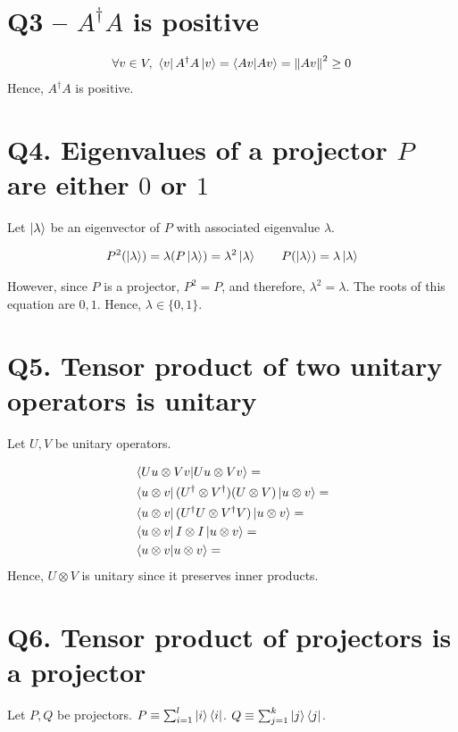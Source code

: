 \documentclass[11pt]{book}
\begin{document}
\begin{align*}
\end{align*}

\section{Q3 -- $A^\dagger A$ is positive}
\begin{align*}
    \forall v \in V, ~\bra v A^\dagger A \ket v = \bra {A v} \ket {A v} = \norm{A v}^2 \geq 0
\end{align*}
Hence, $A^\dagger A$ is positive.

\section{Q4. Eigenvalues of a projector $P$ are either $0$ or $1$}
Let $\ket \lambda$ be an eigenvector of $P$ with associated eigenvalue
$\lambda$.  

\begin{align*}
    P^2 (\ket \lambda) = \lambda (P \ket \lambda) = \lambda ^2 \ket \lambda \qquad
    P (\ket \lambda) = \lambda \ket \lambda
\end{align*}

However, since $P$ is a projector, $P^2 = P$, and therefore, $\lambda^2 = \lambda$.
The roots of this equation are $0, 1$. Hence, $\lambda \in \{0, 1\}$.

\section{Q5. Tensor product of two unitary operators is unitary}
Let $U, V$ be unitary operators.

\begin{align*}
    &\bra{U u \otimes V v} \ket{U u \otimes V v} = \\
    &\bra{u \otimes v} (U^\dagger \otimes V^\dagger) (U \otimes V) \ket{u \otimes v} =  \\
    &\bra{u \otimes v} (U^\dagger U \otimes V^\dagger V) \ket{u \otimes v} = \\
    &\bra{u \otimes v} I \otimes I \ket{u \otimes v} = \\
    &\bra{u \otimes v} \ket{u \otimes v} = \\
\end{align*}
Hence, $U \otimes V$ is unitary since it preserves inner products.

\section{Q6. Tensor product of projectors is a projector}
Let $P, Q$ be projectors. $P \equiv \sum_{i=1}^l \ket{i}\bra{i}$.
$Q \equiv \sum_{j=1}^k \ket{j}\bra{j}$.
\end{document}
